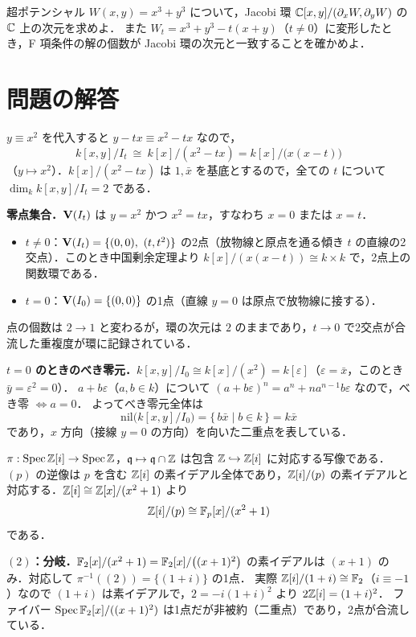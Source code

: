 超ポテンシャル $W(x,y)=x^3+y^3$ について，Jacobi 環 $\mathbb{C}[x,y]/(\partial_xW,\partial_yW)$ の $\mathbb{C}$ 上の次元を求めよ．
また $W_t=x^3+y^3-t(x+y)$（$t\ne0$）に変形したとき，F 項条件の解の個数が Jacobi 環の次元と一致することを確かめよ．

\section*{問題の解答}

$y\equiv x^2$ を代入すると $y-tx\equiv x^2-tx$ なので，
\[
  k[x,y]/I_t\ \cong\ k[x]/(x^2-tx)=k[x]/\bigl(x(x-t)\bigr)
\]
（$y\mapsto x^2$）．$k[x]/(x^2-tx)$ は $1,\bar x$ を基底とするので，全ての $t$ について $\dim_k k[x,y]/I_t=2$ である．

\textbf{零点集合．}$\mathbf{V}(I_t)$ は $y=x^2$ かつ $x^2=tx$，すなわち $x=0$ または $x=t$．
\begin{itemize}
  \item $t\neq0$：$\mathbf{V}(I_t)=\{(0,0),\ (t,t^2)\}$ の2点（放物線と原点を通る傾き $t$ の直線の2交点）．このとき中国剰余定理より $k[x]/(x(x-t))\cong k\times k$ で，2点上の関数環である．
  \item $t=0$：$\mathbf{V}(I_0)=\{(0,0)\}$ の1点（直線 $y=0$ は原点で放物線に接する）．
\end{itemize}
点の個数は $2\to1$ と変わるが，環の次元は $2$ のままであり，$t\to0$ で2交点が合流した重複度が環に記録されている．

\textbf{$t=0$ のときのべき零元．}$k[x,y]/I_0\cong k[x]/(x^2)=k[\varepsilon]$（$\varepsilon=\bar x$，このとき $\bar y=\varepsilon^2=0$）．
$a+b\varepsilon$（$a,b\in k$）について $(a+b\varepsilon)^n=a^n+na^{n-1}b\varepsilon$ なので，べき零 $\iff a=0$．
よってべき零元全体は
\[
  \mathrm{nil}\bigl(k[x,y]/I_0\bigr)=\{\,b\bar x\mid b\in k\,\}=k\bar x
\]
であり，$x$ 方向（接線 $y=0$ の方向）を向いた二重点を表している．

$\pi:\operatorname{Spec}\mathbb{Z}[i]\to\operatorname{Spec}\mathbb{Z}$，$\mathfrak{q}\mapsto\mathfrak{q}\cap\mathbb{Z}$ は包含 $\mathbb{Z}\hookrightarrow\mathbb{Z}[i]$ に対応する写像である．
$(p)$ の逆像は $p$ を含む $\mathbb{Z}[i]$ の素イデアル全体であり，$\mathbb{Z}[i]/(p)$ の素イデアルと対応する．$\mathbb{Z}[i]\cong\mathbb{Z}[x]/(x^2+1)$ より
\[
  \mathbb{Z}[i]/(p)\cong\mathbb{F}_p[x]/(x^2+1)
\]
である．

\textbf{$(2)$：分岐．}$\mathbb{F}_2[x]/(x^2+1)=\mathbb{F}_2[x]/\bigl((x+1)^2\bigr)$ の素イデアルは $(x+1)$ のみ．対応して $\pi^{-1}((2))=\{(1+i)\}$ の1点．
実際 $\mathbb{Z}[i]/(1+i)\cong\mathbb{F}_2$（$i\equiv-1$）なので $(1+i)$ は素イデアルで，$2=-i(1+i)^2$ より $2\mathbb{Z}[i]=(1+i)^2$．
ファイバー $\operatorname{Spec}\mathbb{F}_2[x]/((x+1)^2)$ は1点だが非被約（二重点）であり，2点が合流している．


